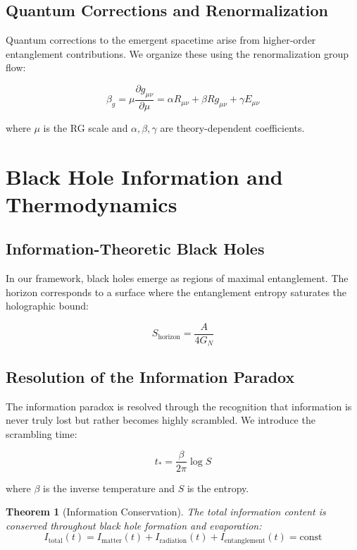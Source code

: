 \documentclass[12pt,a4paper]{article}
\newtheorem{theorem}{Theorem}[section]
\begin{document}
\subsection{Quantum Corrections and Renormalization}

Quantum corrections to the emergent spacetime arise from higher-order entanglement contributions. We organize these using the renormalization group flow:

\begin{equation}
\beta_g = \mu \frac{\partial g_{\mu\nu}}{\partial \mu} = \alpha R_{\mu\nu} + \beta R g_{\mu\nu} + \gamma E_{\mu\nu}
\end{equation}

where $\mu$ is the RG scale and $\alpha, \beta, \gamma$ are theory-dependent coefficients.

\section{Black Hole Information and Thermodynamics}

\subsection{Information-Theoretic Black Holes}

In our framework, black holes emerge as regions of maximal entanglement. The horizon corresponds to a surface where the entanglement entropy saturates the holographic bound:

\begin{equation}
S_{\text{horizon}} = \frac{A}{4G_N}
\end{equation}

\subsection{Resolution of the Information Paradox}

The information paradox is resolved through the recognition that information is never truly lost but rather becomes highly scrambled. We introduce the scrambling time:

\begin{equation}
t_* = \frac{\beta}{2\pi} \log S
\end{equation}

where $\beta$ is the inverse temperature and $S$ is the entropy.

\begin{theorem}[Information Conservation]
The total information content is conserved throughout black hole formation and evaporation:
\begin{equation}
I_{\text{total}}(t) = I_{\text{matter}}(t) + I_{\text{radiation}}(t) + I_{\text{entanglement}}(t) = \text{const}
\end{equation}
\end{theorem}
\end{document}

